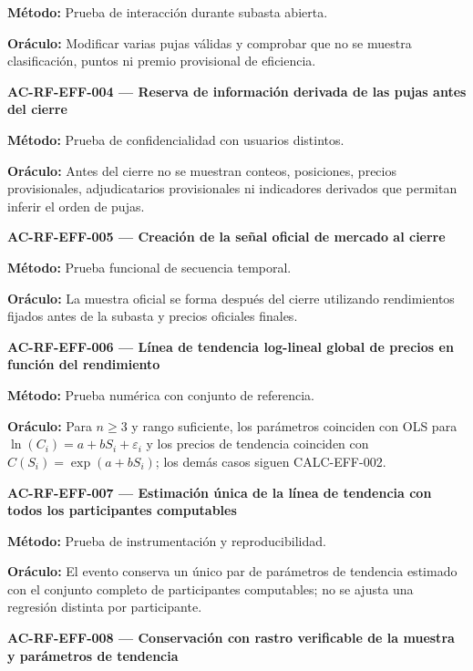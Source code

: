 \documentclass[10pt,letterpaper]{article}
\begin{document}
\textbf{Método:} Prueba de interacción durante subasta abierta.\par
\textbf{Oráculo:} Modificar varias pujas válidas y comprobar que no se muestra clasificación, puntos ni premio provisional de eficiencia.\par\vspace{0.45em}
\noindent\textbf{AC-RF-EFF-004 --- Reserva de información derivada de las pujas antes del cierre}\par
\textbf{Método:} Prueba de confidencialidad con usuarios distintos.\par
\textbf{Oráculo:} Antes del cierre no se muestran conteos, posiciones, precios provisionales, adjudicatarios provisionales ni indicadores derivados que permitan inferir el orden de pujas.\par\vspace{0.45em}
\noindent\textbf{AC-RF-EFF-005 --- Creación de la señal oficial de mercado al cierre}\par
\textbf{Método:} Prueba funcional de secuencia temporal.\par
\textbf{Oráculo:} La muestra oficial se forma después del cierre utilizando rendimientos fijados antes de la subasta y precios oficiales finales.\par\vspace{0.45em}
\noindent\textbf{AC-RF-EFF-006 --- Línea de tendencia log-lineal global de precios en función del rendimiento}\par
\textbf{Método:} Prueba numérica con conjunto de referencia.\par
\textbf{Oráculo:} Para $n\ge3$ y rango suficiente, los parámetros coinciden con OLS para $\ln(C_i)=a+bS_i+\varepsilon_i$ y los precios de tendencia coinciden con $\widehat C(S_i)=\exp(a+bS_i)$; los demás casos siguen CALC-EFF-002.\par\vspace{0.45em}
\noindent\textbf{AC-RF-EFF-007 --- Estimación única de la línea de tendencia con todos los participantes computables}\par
\textbf{Método:} Prueba de instrumentación y reproducibilidad.\par
\textbf{Oráculo:} El evento conserva un único par de parámetros de tendencia estimado con el conjunto completo de participantes computables; no se ajusta una regresión distinta por participante.\par\vspace{0.45em}
\noindent\textbf{AC-RF-EFF-008 --- Conservación con rastro verificable de la muestra y parámetros de tendencia}\par
\end{document}
